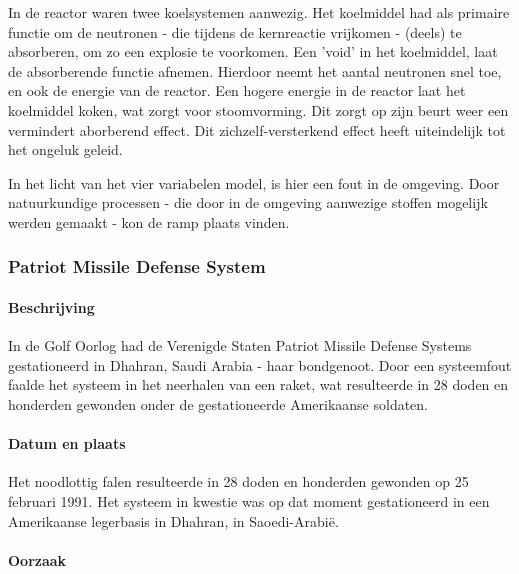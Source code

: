 \documentclass{article}
\begin{document}
				In de reactor waren twee koelsystemen aanwezig. Het koelmiddel had als primaire functie om de neutronen - die tijdens de kernreactie vrijkomen - (deels) te absorberen, om zo een explosie te voorkomen. Een 'void' in het koelmiddel, laat de absorberende functie afnemen. Hierdoor neemt het aantal neutronen snel toe, en ook de energie van de reactor. Een hogere energie in de reactor laat het koelmiddel koken, wat zorgt voor stoomvorming. Dit zorgt op zijn beurt weer een vermindert aborberend effect. Dit zichzelf-versterkend effect heeft uiteindelijk tot het ongeluk geleid. \par

				In het licht van het vier variabelen model, is hier een fout in de omgeving. Door natuurkundige processen - die door in de omgeving aanwezige stoffen mogelijk werden gemaakt - kon de ramp plaats vinden. \par
			
			\subsubsection{Patriot Missile Defense System}

				\paragraph{Beschrijving}

					In de Golf Oorlog had de Verenigde Staten Patriot Missile Defense Systems gestationeerd in Dhahran, Saudi Arabia - haar bondgenoot. Door een systeemfout faalde het systeem in het neerhalen van een raket, wat resulteerde in 28 doden en honderden gewonden onder de gestationeerde Amerikaanse soldaten. \par

				\paragraph{Datum en plaats}

					Het noodlottig falen resulteerde in 28 doden en honderden gewonden op 25 februari 1991. Het systeem in kwestie was op dat moment gestationeerd in een Amerikaanse legerbasis in Dhahran, in Saoedi-Arabië. \cite{general1992patriot} \par

				\paragraph{Oorzaak}
\end{document}
